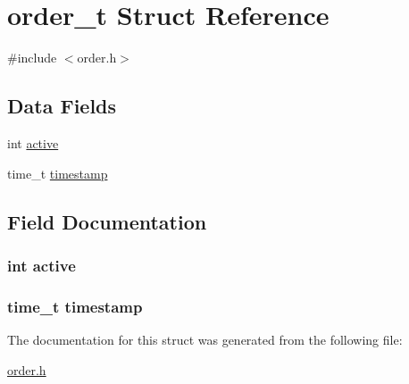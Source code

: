 \hypertarget{structorder__t}{\section{order\-\_\-t Struct Reference}
\label{structorder__t}
}


{\ttfamily \#include $<$order.\-h$>$}

\subsection*{Data Fields}
\begin{DoxyCompactItemize}
\item 
int \hyperlink{structorder__t_aa5805c5e936174e5092bf7a5b78e7e64}{active}
\item 
time\-\_\-t \hyperlink{structorder__t_a2f48d949c7a1e7bf2ce81c70caa7c3ec}{timestamp}
\end{DoxyCompactItemize}


\subsection{Field Documentation}
\hypertarget{structorder__t_aa5805c5e936174e5092bf7a5b78e7e64}{
\subsubsection[{active}]{\setlength{\rightskip}{0pt plus 5cm}int active}}\label{structorder__t_aa5805c5e936174e5092bf7a5b78e7e64}
\hypertarget{structorder__t_a2f48d949c7a1e7bf2ce81c70caa7c3ec}{
\subsubsection[{timestamp}]{\setlength{\rightskip}{0pt plus 5cm}time\-\_\-t timestamp}}\label{structorder__t_a2f48d949c7a1e7bf2ce81c70caa7c3ec}


The documentation for this struct was generated from the following file\-:\begin{DoxyCompactItemize}
\item 
\hyperlink{order_8h}{order.\-h}\end{DoxyCompactItemize}
